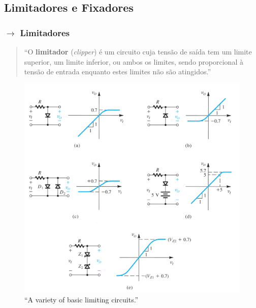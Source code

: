 \clearpage
\subsection[2.4 Limitadores e Fixadores]{\hspace*{0.075 em}\raisebox{0.2 em}{$\pmb{\drsh}$} Limitadores e Fixadores}
\label{subsec:limitadores-e-fixadores}

\subsubsection[2.4.1 Limitadores]{$\pmb{\rightarrow}$ Limitadores}

\begin{quote}
    ``O \textbf{limitador} (\textit{clipper}) é um circuito cuja tensão de saída tem um limite superior, um limite inferior, ou ambos os limites, sendo proporcional à tensão de entrada enquanto estes limites não são atingidos.''\cite{medeiros:ICEE}
\end{quote}

\vspace{-1.5em}
\begin{figure}[H]
    \centering
    \includegraphics[width=0.8\linewidth]{img/2/limitadores.png}
    \caption{``A variety of basic limiting circuits.''\cite{sedra-smith:microelectronic-circuits}}
    \label{fig:limitadores}
\end{figure}

